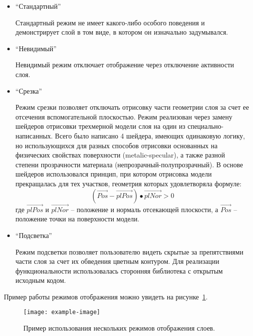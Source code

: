 \begin{itemize}
    \item {
        ``Стандартный''

        Стандартный режим не имеет какого-либо особого поведения и
        демонстрирует слой в том виде, в котором он изначально задумывался.
    }
    \item {
        ``Невидимый''

        Невидимый режим отключает отображение через отключение активности слоя.
    }
    \item {
        ``Срезка''

        Режим срезки позволяет отключать отрисовку части геометрии слоя
        за счет ее отсечения вспомогательной плоскостью.
        Режим реализован через замену шейдеров отрисовки трехмерной
        модели слоя на один из специально-написанных.
        Всего было написано 4 шейдера, имеющих одинаковую логику,
        но использующихся для разных способов отрисовки основанных на физических
        свойствах поверхности (metalic-specular\cite{DocUnity}),
        а также разной степени прозрачности материала (непрозрачный-полупрозрачный).
        В основе шейдеров использовался принцип,
        при котором отрисовка модели прекращалась для тех участков,
        геометрия которых удовлетворяла формуле:
        \[
            ( \overrightarrow{Pos} - \overrightarrow{plPos} ) \bullet
            \overrightarrow{plNor} > 0
        \]
        где $\overrightarrow{plPos}$ и $\overrightarrow{plNor}$ --
        положение и нормаль отсекающей плоскости,
        а $\overrightarrow{Pos}$ -- положение точки на поверхности модели.%
        \cite{UnityCrossSection}
    }
    \item {
        ``Подсветка''

        Режим подсветки позволяет пользователю видеть скрытые за препятствиями
        части слоя за счет их обведения цветным контуром.
        Для реализации функциональности использовалась сторонняя библиотека
        с открытым исходным кодом.\cite{UnityFxOutline}
    }
\end{itemize}

Пример работы режимов отображения можно увидеть
на рисунке~\ref{figure:LayerModeExample}.

\begin{figure}[!htp]
    \centering
    \texttt{[image: example-image]}
    \caption{Пример использования нескольких режимов отображения слоев.}
    \label{figure:LayerModeExample}
\end{figure}
